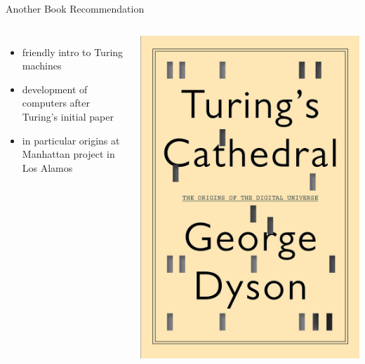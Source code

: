 \documentclass[xcolor={usenames,svgnames,x11names,dvipsnames,table}]{beamer}
\begin{document}
\begin{frame}{Another Book Recommendation}
    \begin{columns}
            \begin{itemize}
                \item friendly intro to Turing machines
                \item development of computers after Turing's initial paper
                \item in particular origins at\\
                    Manhattan project in Los Alamos
            \end{itemize}
            \includegraphics[width=1\linewidth]{./img/turings_cathedral.jpg}
    \end{columns}
\end{frame}
\end{document}
